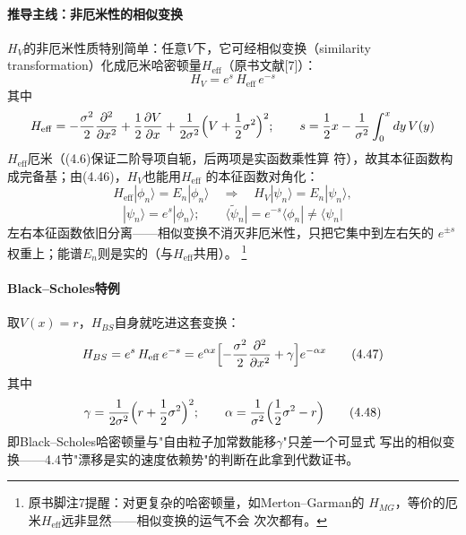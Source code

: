 \paragraph{推导主线：非厄米性的相似变换}
$H_{V}$的非厄米性质特别简单：任意$V$下，它可经相似变换（similarity
transformation）化成厄米哈密顿量$H_{\mathrm{eff}}$（原书文献[7]）：
\begin{equation*}
H_{V}=e^{s}\,H_{\mathrm{eff}}\,e^{-s}
\tag{4.46}
\end{equation*}
其中
\begin{equation*}
H_{\mathrm{eff}}=-\frac{\sigma^{2}}{2}\frac{\partial^{2}}{\partial x^{2}}
+\frac{1}{2}\frac{\partial V}{\partial x}
+\frac{1}{2\sigma^{2}}\Bigl(V+\frac{1}{2}\sigma^{2}\Bigr)^{2}
;\qquad
s=\frac{1}{2}x-\frac{1}{\sigma^{2}}\int_{0}^{x}dy\,V(y)
\end{equation*}
$H_{\mathrm{eff}}$厄米（(4.6)保证二阶导项自轭，后两项是实函数乘性算
符），故其本征函数构成完备基；由(4.46)，$H_{V}$也能用$H_{\mathrm{eff}}$
的本征函数对角化：
\begin{equation*}
H_{\mathrm{eff}}|\phi_{n}\rangle=E_{n}|\phi_{n}\rangle
\quad\Longrightarrow\quad
H_{V}|\psi_{n}\rangle=E_{n}|\psi_{n}\rangle,
\end{equation*}
\begin{equation*}
|\psi_{n}\rangle=e^{s}|\phi_{n}\rangle
;\qquad
\langle\tilde{\psi}_{n}|=e^{-s}\langle\phi_{n}|\neq\langle\psi_{n}|
\end{equation*}
左右本征函数依旧分离——相似变换不消灭非厄米性，只把它集中到左右矢的
$e^{\pm s}$权重上；能谱$E_{n}$则是实的（与$H_{\mathrm{eff}}$共用）。
\footnote{原书脚注7提醒：对更复杂的哈密顿量，如Merton--Garman的
$H_{MG}$，等价的厄米$H_{\mathrm{eff}}$远非显然——相似变换的运气不会
次次都有。}

\paragraph{Black--Scholes特例}
取$V(x)=r$，$H_{BS}$自身就吃进这套变换：
\begin{equation*}
H_{BS}=e^{s}\,H_{\mathrm{eff}}\,e^{-s}
=e^{\alpha x}\Bigl[-\frac{\sigma^{2}}{2}
\frac{\partial^{2}}{\partial x^{2}}+\gamma\Bigr]e^{-\alpha x}
\tag{4.47}
\end{equation*}
其中
\begin{equation*}
\gamma=\frac{1}{2\sigma^{2}}\Bigl(r+\frac{1}{2}\sigma^{2}\Bigr)^{2}
;\qquad
\alpha=\frac{1}{\sigma^{2}}\Bigl(\frac{1}{2}\sigma^{2}-r\Bigr)
\tag{4.48}
\end{equation*}
即Black--Scholes哈密顿量与"自由粒子加常数能移$\gamma$"只差一个可显式
写出的相似变换——4.4节"漂移是实的速度依赖势"的判断在此拿到代数证书。

